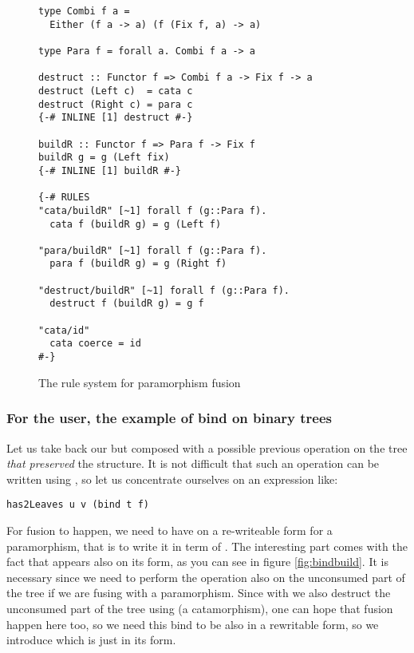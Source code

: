 \begin{figure}
\begin{verbatim}
type Combi f a =
  Either (f a -> a) (f (Fix f, a) -> a)
  
type Para f = forall a. Combi f a -> a 

destruct :: Functor f => Combi f a -> Fix f -> a
destruct (Left c)  = cata c
destruct (Right c) = para c
{-# INLINE [1] destruct #-}

buildR :: Functor f => Para f -> Fix f
buildR g = g (Left fix)
{-# INLINE [1] buildR #-}

{-# RULES
"cata/buildR" [~1] forall f (g::Para f).
  cata f (buildR g) = g (Left f)

"para/buildR" [~1] forall f (g::Para f).
  para f (buildR g) = g (Right f)

"destruct/buildR" [~1] forall f (g::Para f).
  destruct f (buildR g) = g f

"cata/id"
  cata coerce = id
#-}
\end{verbatim}
\caption{The rule system for paramorphism fusion}
\label{fig:para}
\end{figure}

\subsubsection{For the user, the example of bind on binary trees}
Let us take back our   but composed with a possible previous operation on the tree \emph{that preserved} the structure. It is not difficult that such an operation can be written using , so let us concentrate ourselves on an expression like:

\begin{verbatim}
has2Leaves u v (bind t f)
\end{verbatim}

\noindent For fusion to happen, we need to have  on a re-writeable form for a paramorphism, that is to write it in term of . The interesting part comes with the fact that  appears also on its  form, as you can see in figure \ref{fig:bindbuild}. It is necessary since we need to perform the  operation also on the unconsumed part of the tree if we are fusing with a paramorphism. Since with  we also destruct the unconsumed part of the tree using  (a catamorphism), one can hope that fusion happen here too, so we need this bind to be also in a rewritable form, so we introduce  which is just  in its  form.

